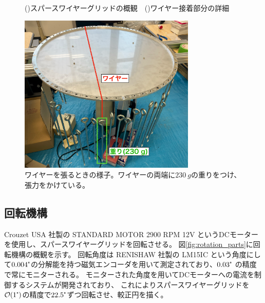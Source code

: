 \documentclass[../../main.tex]{subfiles}
\begin{document}
\begin{figure}[H]
\begin{minipage}[b]{0.48\columnwidth}
        \subcaption{}
        \label{fig:wire_detail_view}
    \end{minipage}
    \caption{()スパースワイヤーグリッドの概観~\cite{swg:Murata_2023}\ ()ワイヤー接着部分の詳細}
    \label{fig:swg}
\end{figure}
\begin{figure}[H]
    \centering
    \includegraphics[width=0.75\textwidth]{wiregrid/wire_attachment.pdf}
    \caption[ワイヤーを張るときの様子]{ワイヤーを張るときの様子。ワイヤーの両端に$\SI{230}{g}$の重りをつけ、張力をかけている。}
    \label{fig:wire_attachment}
\end{figure}
\subsection{回転機構}
Crouzet USA 社製の STANDARD MOTOR 2900 RPM 12V というDCモーターを使用し、スパースワイヤーグリッドを回転させる。
図\ref{fig:rotation_parts}に回転機構の概観を示す。
回転角度は RENISHAW 社製の LM15IC という角度にして$0.004\tcdegree$の分解能を持つ磁気エンコーダを用いて測定されており、$0.03\tcdegree$ の精度で常にモニターされる。
モニターされた角度を用いてDCモーターへの電流を制御するシステムが開発されており、
これによりスパースワイヤーグリッドを$\order{1\tcdegree}$の精度で$22.5\tcdegree$ずつ回転させ、較正円を描く\cite{swg:nakata}。
\end{document}
